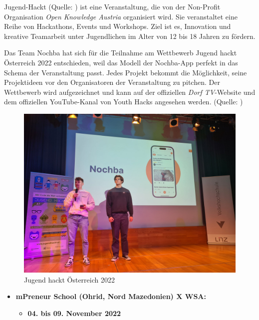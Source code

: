 Jugend-Hackt (Quelle: \cite{https://jugendhackt.org/} ) ist eine Veranstaltung, die von der Non-Profit Organisation \textit{Open Knowledge Austria} organisiert wird. Sie veranstaltet eine Reihe von Hackathons, Events und Workshops. Ziel ist es, Innovation und kreative Teamarbeit unter Jugendlichen im Alter von 12 bis 18 Jahren zu fördern.

Das Team Nochba hat sich für die Teilnahme am Wettbewerb Jugend hackt Österreich 2022 entschieden, weil das Modell der Nochba-App perfekt in das Schema der Veranstaltung passt. Jedes Projekt bekommt die Möglichkeit, seine Projektideen vor den Organisatoren der Veranstaltung zu pitchen. Der Wettbewerb wird aufgezeichnet und kann auf der offiziellen \textit{Dorf TV}-Website und dem offiziellen YouTube-Kanal von Youth Hacks angesehen werden. (Quelle: \cite{youtube-jugendhackt-pitch} )


\begin{figure}[H]
    \centering
    \includegraphics[width=1\textwidth]{pics/JugendHackt.jpeg}
    \caption{Jugend hackt Österreich 2022}
    \label{fig:jugendHackt}
\end{figure}

\begin{itemize}
    \item \textbf{mPreneur School (Ohrid, Nord Mazedonien) X WSA:}
          \begin{itemize}
              \item \textbf{04. bis 09. November 2022}
          \end{itemize}
\end{itemize}


